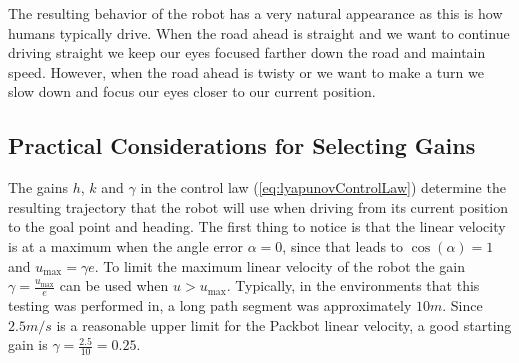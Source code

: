 The resulting behavior of the robot has a very natural appearance as this is how humans typically drive. When the road ahead is straight and we want to continue driving straight we keep our eyes focused farther down the road and maintain speed. However, when the road ahead is twisty or we want to make a turn we slow down and focus our eyes closer to our current position.

\subsection{Practical Considerations for Selecting Gains}
\label{sec:lyapunovTrajectoryConvergence}
The gains $h$, $k$ and $\gamma$ in the control law (\ref{eq:lyapunovControlLaw}) determine the resulting trajectory that the robot will use when driving from its current position to the goal point and heading. The first thing to notice is that the linear velocity is at a maximum when the angle error $\alpha=0$, since that leads to $\cos(\alpha)=1$ and $u_{\text{max}}=\gamma e$. To limit the maximum linear velocity of the robot the gain $\gamma=\frac{u_{\text{max}}}{e}$ can be used when $u>u_{\text{max}}$. Typically, in the environments that this testing was performed in, a long path segment was approximately $10m$. Since $2.5m/s$ is a reasonable upper limit for the Packbot linear velocity, a good starting gain is $\gamma=\frac{2.5}{10}=0.25$.

